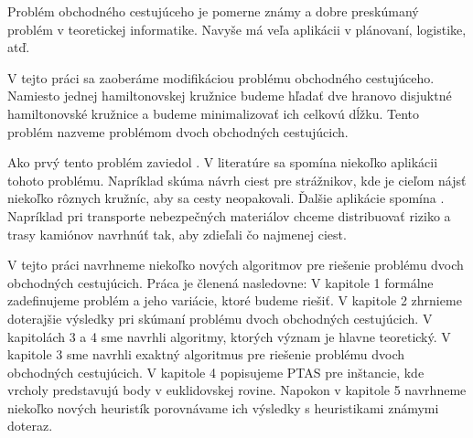 Problém obchodného cestujúceho je pomerne známy a dobre preskúmaný problém
v teoretickej informatike. Navyše má veľa aplikácii v plánovaní, logistike, atď.

V tejto práci sa zaoberáme modifikáciou problému obchodného cestujúceho.
Namiesto jednej hamiltonovskej kružnice budeme hľadať dve hranovo disjuktné
hamiltonovské kružnice a budeme minimalizovať ich celkovú dĺžku.
Tento problém nazveme problémom dvoch obchodných cestujúcich.

Ako prvý tento problém zaviedol \cite{krarup}. V literatúre sa spomína niekoľko aplikácii
tohoto problému. Napríklad \cite{appl} skúma návrh ciest pre strážnikov, kde je cieľom
nájsť niekoľko rôznych kružníc, aby sa cesty neopakovali. Ďalšie aplikácie
spomína \cite{duchenne}. Napríklad pri transporte nebezpečných materiálov
chceme distribuovať riziko a trasy kamiónov navrhnúť tak, aby zdieľali čo
najmenej ciest.

V tejto práci navrhneme niekoľko nových algoritmov pre riešenie
problému dvoch obchodných cestujúcich. Práca je členená nasledovne:
V kapitole 1 formálne zadefinujeme problém a jeho variácie, ktoré budeme riešiť.
V kapitole 2 zhrnieme doterajšie výsledky pri skúmaní problému dvoch
obchodných cestujúcich. V kapitolách 3 a 4 sme navrhli algoritmy, ktorých
význam je hlavne teoretický. V kapitole 3 sme navrhli exaktný algoritmus
pre riešenie problému dvoch obchodných cestujúcich. V kapitole 4 popisujeme
PTAS pre inštancie, kde vrcholy predstavujú body v euklidovskej rovine.
Napokon v kapitole 5 navrhneme niekoľko nových heuristík
porovnávame ich výsledky s heuristikami známymi doteraz. 


